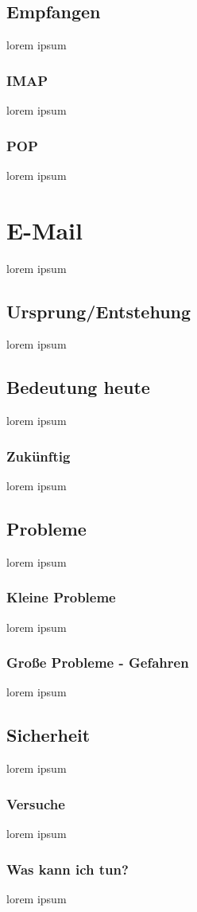 \documentclass[12pt,a4paper]{report}
\begin{document}
\subsection{Empfangen}
lorem ipsum
\subsubsection{IMAP}
lorem ipsum
\subsubsection{POP}
lorem ipsum
\section{E-Mail}
lorem ipsum
\subsection{Ursprung/Entstehung}
lorem ipsum
\subsection{Bedeutung heute}
lorem ipsum
\subsubsection{Zukünftig}
lorem ipsum
\subsection{Probleme}
lorem ipsum
\subsubsection{Kleine Probleme}
lorem ipsum
\subsubsection{Große Probleme - Gefahren}
lorem ipsum
\subsection{Sicherheit}
lorem ipsum
\subsubsection{Versuche}
lorem ipsum
\subsubsection{Was kann ich tun?}
lorem ipsum
\end{document}
